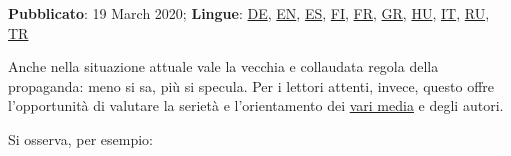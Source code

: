 \textbf{Pubblicato}: 19 March 2020; \textbf{Lingue}:
\href{https://swprs.org/corona-medien-propaganda/}{DE},
\href{https://swprs.org/corona-media-propaganda/}{EN},
\href{http://piensachile.com/2020/03/corona-medios-de-comunicacion-propaganda/}{ES},
\href{https://swprs.org/koronasta-mediasta-ja-propagandasta/}{FI},
\href{https://swprs.org/sur-le-coronavirus-les-medias-et-la-propagande/}{FR},
\href{https://swprs.org/corona-media-propaganda-greek/}{GR},
\href{https://swprs.org/korona-media-propaganda/}{HU},
\href{https://swprs.org/corona-media-propaganda-it/}{IT},
\href{https://swprs.org/\%d0\%be-\%d0\%ba\%d0\%be\%d1\%80\%d0\%be\%d0\%bd\%d0\%b0\%d0\%b2\%d0\%b8\%d1\%80\%d1\%83\%d1\%81\%d0\%b5-\%d1\%81\%d0\%bc\%d0\%b8-\%d0\%b8-\%d0\%bf\%d1\%80\%d0\%be\%d0\%bf\%d0\%b0\%d0\%b3\%d0\%b0\%d0\%bd\%d0\%b4\%d0\%b5/}{RU},
\href{https://swprs.org/korona-medya-ve-propaganda-uezerine/}{TR}

Anche nella situazione attuale vale la vecchia e collaudata regola della
propaganda: meno si sa, più si specula. Per i lettori attenti, invece,
questo offre l'opportunità di valutare la serietà e l'orientamento dei
\href{https://swprs.org/medien-navigator/}{vari media} e degli autori.

Si osserva, per esempio:

